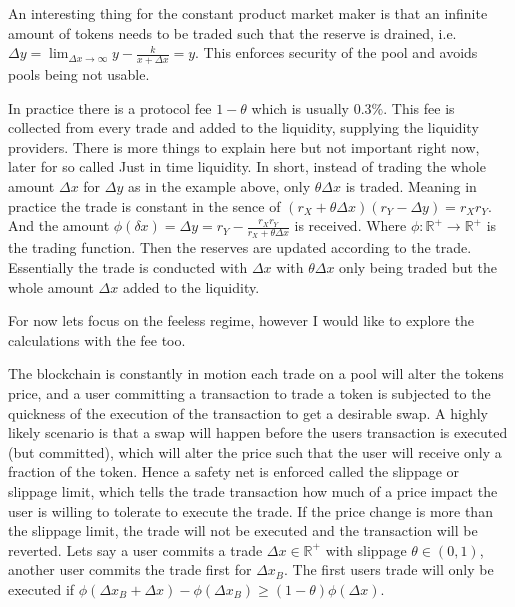 An interesting thing for the constant product market maker is that an
infinite amount of tokens needs to be traded such that the reserve is
drained, i.e. $\Delta y = \lim_{\Delta x\to\infty} y - \frac{k}{x + \Delta x}
= y$. This enforces security of the pool and avoids pools being not usable.
\newline

In practice there is a protocol fee $1-\theta$ which is usually $0.3\%$. This
fee is collected from every trade and added to the liquidity, supplying the
liquidity providers. There is more things to explain here but not important
right now, later for so called Just in time liquidity. In short, instead of
trading the whole amount $\Delta x$ for $\Delta y$ as in the example above,
only $\theta \Delta x $ is traded. Meaning in practice the trade is constant
in the sence of $(r_X + \theta\Delta x)(r_Y - \Delta y) = r_Xr_Y$. And the
amount $\phi(\delta x) = \Delta y = r_Y - \frac{r_Xr_Y}{r_X + \theta \Delta
x}$ is received. Where $\phi: \mathbb{R}^{+} \to \mathbb{R}^{+}$ is the
trading function. Then the reserves are updated according to the trade.
Essentially the trade is conducted with $\Delta x$ with $\theta \Delta x$
only being traded but the whole amount $\Delta x$ added to the liquidity.
\newline

For now lets focus on the feeless regime, however I would like to explore the
calculations with the fee too.
\newline

The blockchain is constantly in motion each trade on a pool will alter the
tokens price, and a user committing a transaction to trade a token is
subjected to the quickness of the execution of the transaction to get a
desirable swap. A highly likely scenario is that a swap will happen before
the users transaction is executed (but committed), which will alter the
price such that the user will receive only a fraction of the token. Hence a
safety net is enforced called the slippage or slippage limit, which tells the
trade transaction how much of a price impact the user is willing to tolerate
to execute the trade. If the price change is more than the slippage limit,
the trade will not be executed and the transaction will be reverted. Lets say
a user commits a trade $\Delta x \in \mathbb{R}^{+}$ with slippage $\theta \in
(0,1)$, another user commits the trade first for $\Delta x_B$. The first
users trade will only be executed if $\phi(\Delta x_B + \Delta x) -
\phi(\Delta x_B) \ge (1-\theta)\phi(\Delta x)$.
\newline

